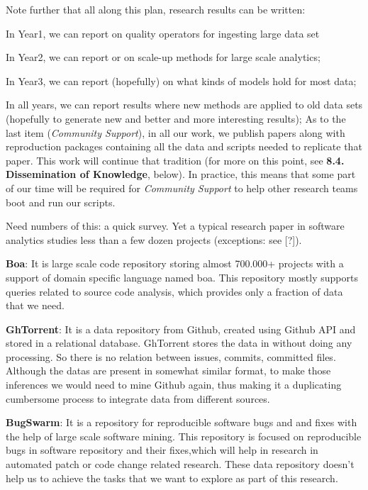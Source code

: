 Note further that all along this plan, research results can be written:
\bi
\item In Year1, we can report on quality operators for ingesting large data set
\item In Year2, we can report or on scale-up methods for large scale analytics;
\item In Year3, we can report (hopefully) on what kinds of models hold for most data;
\item In all years, we can report results where new methods are applied to old data sets (hopefully to generate new and better and more interesting results); 
\ei
As to the  last item ({\em Community Support}), 
in all our work, we  publish papers along with reproduction packages containing all the data and scripts needed to replicate
that paper. This work will continue that tradition (for more on this point, see {\bf 8.4. Dissemination of Knowledge}, below).
  In practice, this means that some part of our time will be required for {\em Community Support} to help other research teams boot and run our scripts.

 


Need numbers of this: a quick survey. Yet  a  typical research paper in software analytics studies less than a few dozen projects (exceptions: see [?]).


\textbf{Boa}: It is large scale code repository storing almost 700.000+ projects with a support of domain specific language named boa. This repository mostly supports queries related to source code analysis, which provides only a fraction of data that we need.

\textbf{GhTorrent}: It is a data repository from Github, created using Github API and stored in a relational database. GhTorrent stores the data in without doing any processing. So there is no relation between issues, commits, committed files. Although the datas are present in somewhat similar format, to make those inferences we would need to mine Github again, thus making it a duplicating cumbersome process to integrate data from different sources.

\textbf{BugSwarm}: It is a repository for reproducible software bugs and and fixes with the help of large scale software mining. This repository is focused on reproducible bugs in software repository and their fixes,which will help in research in automated patch or code change related research. These data repository doesn't help us to achieve the tasks that we want to explore as part of this research.


